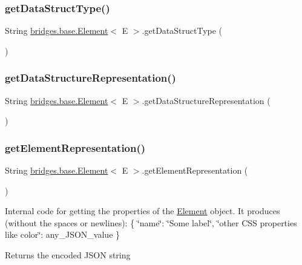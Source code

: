 \subsubsection{\texorpdfstring{getDataStructType()}{getDataStructType()}}
{\footnotesize\ttfamily String \mbox{\hyperlink{classbridges_1_1base_1_1_element}{bridges.\+base.\+Element}}$<$ E $>$.get\+Data\+Struct\+Type (\begin{DoxyParamCaption}{ }\end{DoxyParamCaption})}

\mbox{\label{classbridges_1_1base_1_1_element_ab5e21b5941c018501db2ab41a6fb3823}} 
\subsubsection{\texorpdfstring{getDataStructureRepresentation()}{getDataStructureRepresentation()}}
{\footnotesize\ttfamily String \mbox{\hyperlink{classbridges_1_1base_1_1_element}{bridges.\+base.\+Element}}$<$ E $>$.get\+Data\+Structure\+Representation (\begin{DoxyParamCaption}{ }\end{DoxyParamCaption})}

\mbox{\label{classbridges_1_1base_1_1_element_a8822450cfaf8495bc955d777ad35ea3f}} 
\subsubsection{\texorpdfstring{getElementRepresentation()}{getElementRepresentation()}}
{\footnotesize\ttfamily String \mbox{\hyperlink{classbridges_1_1base_1_1_element}{bridges.\+base.\+Element}}$<$ E $>$.get\+Element\+Representation (\begin{DoxyParamCaption}{ }\end{DoxyParamCaption})}

Internal code for getting the properties of the \mbox{\hyperlink{classbridges_1_1base_1_1_element}{Element}} object. It produces (without the spaces or newlines)\+: \{ \char`\"{}name\char`\"{}\+: \char`\"{}\+Some label\char`\"{}, \char`\"{}other C\+S\+S properties like color\char`\"{}\+: any\+\_\+\+J\+S\+O\+N\+\_\+value \} \begin{DoxyReturn}{Returns}
the encoded J\+S\+ON string 
\end{DoxyReturn}
\mbox{\label{classbridges_1_1base_1_1_element_ad5496f568b4cca3909800eceea5fb47d}} 
